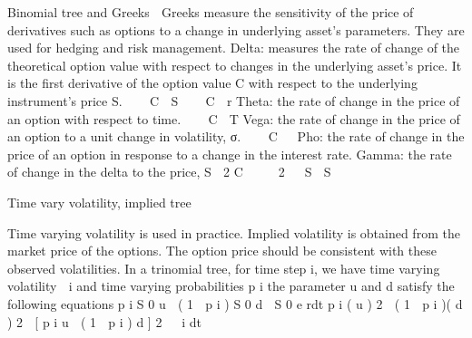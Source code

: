 \begin{frame}
    Binomial tree and Greeks

Greeks measure the sensitivity of the price of derivatives such as options to a
change in underlying asset’s parameters. They are used for hedging and risk
management.
Delta: measures the rate of change of the theoretical option value with
respect to changes in the underlying asset's price.
It is the first derivative of the option value C with respect to the
underlying instrument’s price S.
   C
 S
   C
 r
Theta: the rate of change in the price of an option with respect to time.    C
 T
Vega: the rate of change in the price of an option to a unit change in
volatility, σ.    C
 
Pho: the rate of change in the price of an option in response to a
change in the interest rate.
Gamma: the rate of change in the delta to the price, S
 2 C  
  2 
 S
 S
\end{frame}


\begin{frame}
    Time vary volatility, implied tree

Time varying volatility is used in practice.
Implied volatility is obtained from the market price of the options.
The option price should be consistent with these observed
volatilities.
In a trinomial tree, for time step i, we have time varying volatility  i
and time varying probabilities p i the parameter u and d satisfy
the following equations
p i S 0 u  ( 1  p i ) S 0 d  S 0 e rdt
p i ( u ) 2  ( 1  p i )( d ) 2  [ p i u  ( 1  p i ) d ] 2   i dt
\end{frame}


%



%



%

